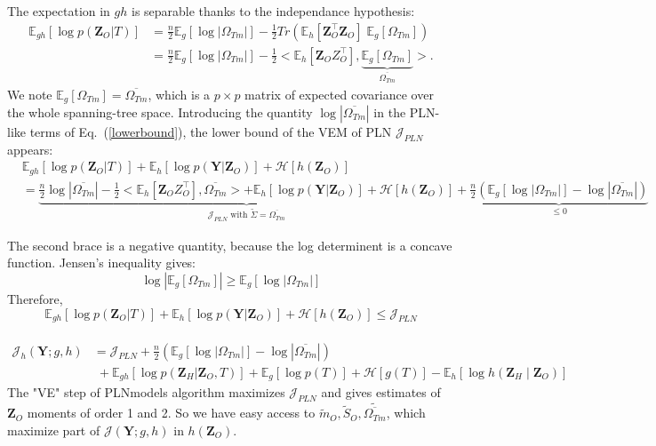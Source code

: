 \documentclass[11pt,a4paper]{article}
\newcommand{\entr}{\mathcal{H}}
\newcommand{\Ybf}{\boldsymbol{Y}}
\newcommand{\Zbf}{\boldsymbol{Z}}
\newcommand{\Esp}{\mathds{E}}
\begin{document}
The expectation in $gh$ is separable thanks to the independance hypothesis:
\begin{align*}
\Esp_{gh}[\log p(\Zbf_O|T)] &=\frac{n}{2} \Esp_g [\log |\Omega_{Tm}|] - \frac{1}{2}  Tr\left(\Esp_h [\Zbf_O^\intercal \Zbf_O ]\; \Esp_g[\Omega_{Tm}]\right)\\
&=\frac{n}{2} \Esp_g [\log |\Omega_{Tm}|] - \frac{1}{2}<\Esp_h [\Zbf_OZ_O^\intercal ], \underbrace{\Esp_g [\Omega_{Tm}]}_{\overline{\Omega_{Tm}}}> .
\end{align*}
We note $\Esp_g [\Omega_{Tm}] = \overline{\Omega_{Tm}}$, which is a $p\times p$ matrix of expected covariance over the whole spanning-tree space. Introducing the quantity  $\log |\overline{\Omega_{Tm}}| $ in the PLN-like terms of Eq.~(\ref{lowerbound}), the lower bound of the VEM of PLN $\mathcal{J}_{PLN}$ appears:
\begin{align*}
&\Esp_{gh}[\log p(\Zbf_O | T)] +\Esp_h[\log p(\Ybf|\Zbf_O)]+ \entr[h(\Zbf_O)]\\
& =\underbrace{\frac{n}{2} \log |\overline{\Omega_{Tm}}| - \frac{1}{2}<\Esp_h [\Zbf_OZ_O^\intercal ], \overline{\Omega_{Tm}}> + \Esp_{h}[\log p(\Ybf|\Zbf_O)] + \entr[h(\Zbf_O)]}_{\mathcal{J}_{PLN}\text{ with } \widetilde{\Sigma} = \overline{\Omega_{Tm}}} + \underbrace{\frac{n}{2}\left( \Esp_g[\log|\Omega_{Tm}|] - \log|\overline{\Omega_{Tm}}|\right)}_{\leq 0}
\end{align*}


The second brace is a negative quantity, because the log determinent is a concave function. Jensen's inequality gives:
$$\log |\Esp_g[\Omega_{Tm}]| \geq \Esp_g [\log |\Omega_{Tm}|]$$
Therefore, $$\Esp_{gh}[\log p(\Zbf_O | T)] +\Esp_h[\log p(\Ybf|\Zbf_O)]+ \entr[h(\Zbf_O)] \leq \mathcal{J}_{PLN}$$\\
\begin{align*}
\mathcal{J}_{h}(\Ybf; g,h)&= \mathcal{J}_{PLN}+\frac{n}{2}\left(\Esp_g[\log|\Omega_{Tm}|] - \log|\overline{\Omega_{Tm}}|\right)\\
&\;+ \Esp_{gh}[\log p(\Zbf_H | \Zbf_O,T) ]+\Esp_g[\log p(T)] +\entr[g(T)]-\Esp_h[\log h(\Zbf_H\mid \Zbf_O)]
\end{align*}
The "VE" step of PLNmodels algorithm maximizes $\mathcal{J}_{PLN}$ and gives estimates of $\Zbf_O$ moments of order 1 and 2. So we have easy access to $\widetilde{m}_O, \widetilde{S}_O, \widetilde{\overline{\Omega_{Tm}}}$, which maximize part of $\mathcal{J}(\Ybf;g,h)$ in $h(\Zbf_O)$.  \\
\end{document}

